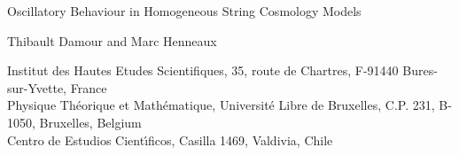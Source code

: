 \documentclass[a4paper,12pt]{article}
\begin{document}
\begin{titlepage}

\begin{centering}

{\Huge Oscillatory Behaviour in Homogeneous String Cosmology Models}

\vspace{2cm}

{\Large Thibault Damour\coordHE{} and Marc Henneaux\coordHE{}} \\

\vspace{.4cm}

\coordHE{} Institut des Hautes Etudes Scientifiques,  35, route de
Chartres,  F-91440 Bures-sur-Yvette, France \\
\vspace{.2cm}
\coordHE{} Physique Th\'eorique et Math\'ematique,  Universit\'e Libre
de Bruxelles,  C.P. 231, B-1050, Bruxelles, Belgium  \\
\vspace{.2cm}
\coordHE{} Centro de Estudios Cient\'{\i}ficos, Casilla 1469, Valdivia, Chile
\vspace{1cm} 

\vspace{2cm}

\end{centering}

\begin{abstract}   

Some  spatially homogeneous Bianchi type I cosmological
models filled with homogeneous ``electric''
\coordHE{}-form fields 
are shown to mimic the never-ending oscillatory behaviour
of generic string cosmologies established recently.  The validity
of the ``Kasner-free-flights plus collisions-on-potential-walls'' picture
is also illustrated in the case of known, non-chaotic,
superstring solutions.

\end{abstract}


\vfill
\end{titlepage}     
\end{document}
